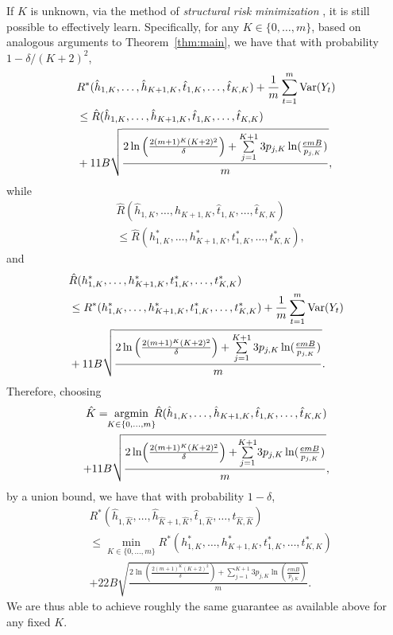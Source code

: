 \documentclass{article}
\begin{document}
If $K$ is unknown, via the method of \emph{structural risk minimization} \cite{vapnik:82,vapnik:98}, it is still possible to effectively learn. Specifically, for any $K \in \{0,\ldots,m\}$, based on analogous arguments to Theorem~\ref{thm:main}, we have that with probability $1-\delta/(K+2)^{2}$, 
\begin{align*}
& R^{*}(\hat{h}_{1,K},\ldots,\hat{h}_{K+1,K},\hat{t}_{1,K},\ldots,\hat{t}_{K,K}) + \frac{1}{m} \sum_{t=1}^{m} {\rm Var}(Y_{t})\\
 & \leq \hat{R}(\hat{h}_{1,K},\ldots,\hat{h}_{K+1,K},\hat{t}_{1,K},\ldots,\hat{t}_{K,K}) 
 \\& + 11 B \sqrt{\frac{2\ln\left(\frac{2 (m+1)^{K} (K+2)^{2}}{\delta}\right) + \sum\limits_{j=1}^{K+1} 3 p_{j,K} \ln(\frac{e m B}{p_{j,K}})}{m}},
\end{align*}
while
\begin{align*}
&\hat{R}(\hat{h}_{1,K},\ldots,\hat{h}_{K+1,K},\hat{t}_{1,K},\ldots,\hat{t}_{K,K}) \\
 &\leq \hat{R}(h_{1,K}^{*},\ldots,h_{K+1,K}^{*},t_{1,K}^{*},\ldots,t_{K,K}^{*}),
\end{align*}
and 
\begin{align*}
&\hat{R}(h_{1,K}^{*},\ldots,h_{K+1,K}^{*},t_{1,K}^{*},\ldots,t_{K,K}^{*})\\
 & \leq R^{*}(h_{1,K}^{*},\ldots,h_{K+1,K}^{*},t_{1,K}^{*},\ldots,t_{K,K}^{*}) 
 + \frac{1}{m} \sum_{t=1}^{m} {\rm Var}(Y_{t})
\\ & + 11 B \sqrt{\frac{2\ln\left(\frac{2 (m+1)^{K} (K+2)^{2}}{\delta}\right) + \sum\limits_{j=1}^{K+1} 3 p_{j,K} \ln(\frac{e m B}{p_{j,K}})}{m}}.
\end{align*}
Therefore, choosing
\begin{multline*}
\hat{K} = \!\!\mathop{\rm argmin}_{K \in \{0,\ldots,m\}}\!\! \hat{R}(\hat{h}_{1,K},\ldots,\hat{h}_{K+1,K},\hat{t}_{1,K},\ldots,\hat{t}_{K,K}) 
\\ + 11 B \sqrt{\frac{2\ln\!\left(\frac{2 (m+1)^{K} (K+2)^{2}}{\delta}\right) + \!\sum\limits_{j=1}^{K+1}\! 3 p_{j,K} \ln(\frac{e m B}{p_{j,K}})}{m}},
\end{multline*}
by a union bound, we have that with probability $1-\delta$, 
\begin{align*}
&R^{*}(\hat{h}_{1,\hat{K}},\ldots,\hat{h}_{\hat{K}+1,\hat{K}},\hat{t}_{1,\hat{K}},\ldots,\hat{t}_{\hat{K},\hat{K}}) \\
 & \leq \min_{K \in \{0,\ldots,m\}} R^{*}(h_{1,K}^{*},\ldots,h_{K+1,K}^{*},t_{1,K}^{*},\ldots,t_{K,K}^{*})
\\ & + 22 B \sqrt{\frac{2\ln\left(\frac{2 (m+1)^{K} (K+2)^{2}}{\delta}\right) + \sum\limits_{j=1}^{K+1} 3 p_{j,K} \ln(\frac{e m B}{p_{j,K}})}{m}}.
\end{align*}
We are thus able to achieve roughly the same guarantee as available above for any fixed $K$.
\end{document}
